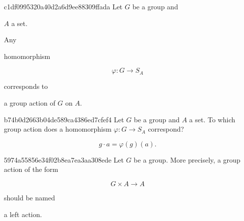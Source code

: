 \begin{note}{c1df0995320a40d2a6d9ee88309ffada}
    Let \({ G }\) be a group and \begin{icloze}{5}\({ A }\) a set.\end{icloze}
    Any \begin{icloze}{3}homomorphism\end{icloze}
    \begin{icloze}{1}
        \[
            \varphi : G \to S_{A}
        \]
    \end{icloze}
    corresponds to \begin{icloze}{2}a group action of \({ G }\) on \({ A }\).\end{icloze}
\end{note}

\begin{note}{b74b0d2663b04de589ca4386ed7cfef4}
    Let \({ G }\) be a group and \({ A }\) a set.
    To which group action does a homomorphism \({ \varphi : G \to S_{A}  }\) correspond?

    \begin{cloze}{1}
        \[
            g \cdot a = \varphi(g)(a).
        \]
    \end{cloze}
\end{note}

\begin{note}{5974a55856e34f02b8ea7ea3aa308ede}
    Let \({ G }\) be a group.
    More precisely, a group action of the form
    \begin{icloze}{2}
        \[
            G \times A \to A
        \]
    \end{icloze}
    should be named \begin{icloze}{1}a left action.\end{icloze}
\end{note}


